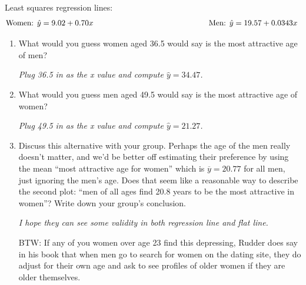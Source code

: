 Least squares regression lines:
$$ \mbox{Women: } \hat{y} = 9.02 + 0.70x \mbox{ \hspace{2in}}
   \mbox{Men: } \hat{y} = 19.57 + 0.0343x \mbox{ \vspace{-.7cm}} $$ 
\begin{enumerate}
  \item What would you guess  women aged 36.5 would say is the
    most attractive age of men? 
\begin{students}
 \vspace{1.5cm}      
\end{students}

\begin{key}
  {\it     Plug 36.5 in as the x value and compute $\hat{y} = 34.47$.}
\end{key}

  \item What would you guess  men aged 49.5 would say is the
    most attractive age of women? 
\begin{students}
 \vspace{1.5cm}      
\end{students}

\begin{key}
  {\it     Plug 49.5 in as the x value and compute $\hat{y} = 21.27$.}
\end{key}

\item Discuss this alternative with your group.  Perhaps the age of
  the men really doesn't matter, and we'd be better off estimating
  their preference by using the mean ``most attractive age for women''
  which is $\overline{y} = 20.77$ for all men, just ignoring the men's age.
   Does that seem like a reasonable way to describe the second plot:
   ``men of all ages find 20.8 years to be the most attractive in women''?
  Write down your group's conclusion.
  \begin{students}
 \vspace{2cm}      
\end{students}

\begin{key}
  {\it    I hope they can see some validity in both regression line
    and flat line.}
\end{key}

  BTW: If any of you women over age 23 find this depressing, Rudder
  does say in his book that when men go to search for women on the
  dating site, they do adjust for their own age and ask to see
  profiles of older women if they are older themselves.  %



\end{enumerate}
